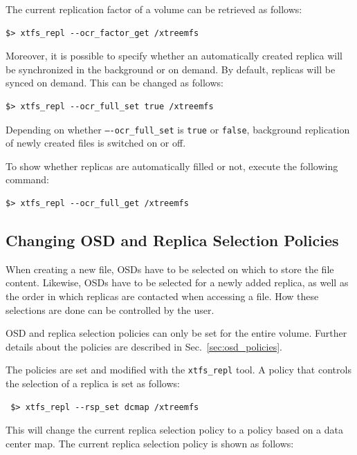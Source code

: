 \documentclass[a4paper,10pt]{book}
\begin{document}
The current replication factor of a volume can be retrieved as follows:

\begin{verbatim}
$> xtfs_repl --ocr_factor_get /xtreemfs
\end{verbatim}

Moreover, it is possible to specify whether an automatically created replica will be synchronized in the background or on demand. By default, replicas will be synced on demand. This can be changed as follows:

\begin{verbatim}
$> xtfs_repl --ocr_full_set true /xtreemfs
\end{verbatim}

Depending on whether \texttt{----ocr\_full\_set} is \texttt{true} or \texttt{false}, background replication of newly created files is switched on or off.

To show whether replicas are automatically filled or not, execute the following command:

\begin{verbatim}
$> xtfs_repl --ocr_full_get /xtreemfs
\end{verbatim}

\subsection{Changing OSD and Replica Selection Policies}\label{sec:osd_select_policy}

When creating a new file, OSDs have to be selected on which to store the file content. Likewise, OSDs have to be selected for a newly added replica, as well as the order in which replicas are contacted when accessing a file. How these selections are done can be controlled by the user.

OSD and replica selection policies can only be set for the entire volume. Further details about the policies are described in Sec.\ \ref{sec:osd_policies}.

The policies are set and modified with the \texttt{xtfs\_repl} tool. A policy that controls the selection of a replica is set as follows:

\begin{verbatim}
 $> xtfs_repl --rsp_set dcmap /xtreemfs
\end{verbatim}

This will change the current replica selection policy to a policy based on a data center map. The current replica selection policy is shown as follows:
\end{document}

